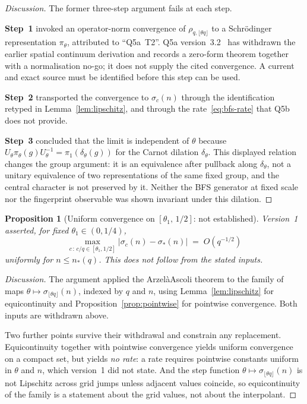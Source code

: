 \documentclass[12pt,a4paper]{article}
\newtheorem{proposition}[theorem]{Proposition}
\theoremstyle{definition}
\theoremstyle{remark}
\begin{document}
    \begin{proof}[Discussion]
      The former three-step argument fails at each step.

      \textbf{Step~1} invoked an operator-norm convergence of
      $\rho_{q,\lfloor\theta q\rfloor}$ to a Schr\"odinger representation $\pi_\theta$,
      attributed to ``Q5a~T2''.
      Q5a version~3.2~\cite{Beau2026q5a} has withdrawn the earlier spatial continuum
      derivation and records a zero-form theorem together with a normalisation no-go; it does
      not supply the cited convergence.
      A current and exact source must be identified before this step can be used.

      \textbf{Step~2} transported the convergence to $\sigma_c(n)$ through the identification
      retyped in Lemma~\ref{lem:lipschitz}, and through the rate~\eqref{eq:bfs-rate} that
      Q5b does not provide.

      \textbf{Step~3} concluded that the limit is independent of $\theta$ because
      $U_\theta \pi_\theta(g) U_\theta^{-1} = \pi_1(\delta_\theta(g))$ for the Carnot
      dilation $\delta_\theta$.
      This displayed relation changes the group argument: it is an equivalence after pullback
      along $\delta_\theta$, not a unitary equivalence of two representations of the same
      fixed group, and the central character is not preserved by it.
      Neither the BFS generator at fixed scale nor the fingerprint observable was shown
      invariant under this dilation.
    \end{proof}

    \begin{proposition}[Uniform convergence on {$[\theta_1,\,1/2]$}: not established]\label{prop:uniform-large}
      Version~1 asserted, for fixed $\theta_1 \in (0,1/4)$,
      \begin{equation}\label{eq:uniform-large}
        \max_{c\,:\,c/q \in [\theta_1, 1/2]}
        |\sigma_c(n) - \sigma_*(n)| \;=\; O(q^{-1/2})
      \end{equation}
      uniformly for $n \leq n_*(q)$.
      This does not follow from the stated inputs.
    \end{proposition}

    \begin{proof}[Discussion]
      The argument applied the Arzel\`a\textendash Ascoli theorem to the family of maps
      $\theta \mapsto \sigma_{\lfloor\theta q\rfloor}(n)$, indexed by $q$ and $n$,
      using Lemma~\ref{lem:lipschitz} for equicontinuity and
      Proposition~\ref{prop:pointwise} for pointwise convergence.
      Both inputs are withdrawn above.

      Two further points survive their withdrawal and constrain any replacement.
      Equicontinuity together with pointwise convergence yields uniform convergence on a
      compact set, but yields \emph{no rate}: a rate requires pointwise constants uniform in
      $\theta$ and $n$, which version~1 did not state.
      And the step function $\theta \mapsto \sigma_{\lfloor\theta q\rfloor}(n)$ is not
      Lipschitz across grid jumps unless adjacent values coincide, so equicontinuity of the
      family is a statement about the grid values, not about the interpolant.
    \end{proof}
\end{document}
